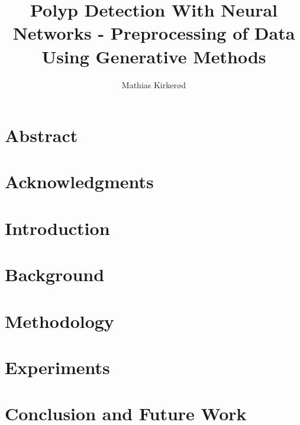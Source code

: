 \documentclass[USenglish]{ifimaster}
\title{Polyp Detection With Neural Networks - Preprocessing of Data Using Generative Methods}
\author{Mathias Kirker{\o}d}
\begin{document}
\setcounter{hyp}{-1}
\setcounter{que}{-1}
\duoforside[dept={Department of Informatics},program={Informatics: Technical and Scientific Applications},long]

\frontmatter{}
\chapter*{Abstract}


\chapter*{Acknowledgments}


\tableofcontents{}
\listoffigures{}
\listoftables{}


\mainmatter{}


\chapter{Introduction} \label{cap:introduction}


\chapter{Background} \label{cap:background}



\chapter{Methodology}\label{cap:methodology}



%

\chapter{Experiments} \label{cap:experiments}



\chapter{Conclusion and Future Work} \label{cap:future}

\end{document}
